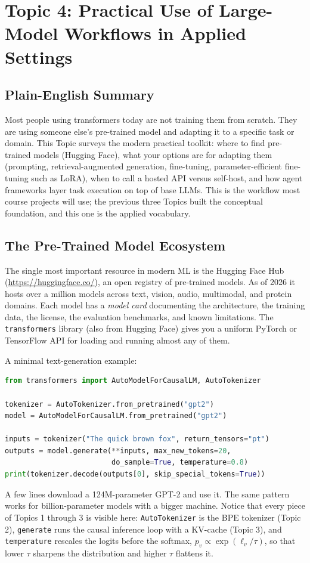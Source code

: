 \documentclass[11pt]{article}
\theoremstyle{remark}
\begin{document}
\clearpage
%
\section{Topic 4: Practical Use of Large-Model Workflows in Applied Settings}
%

\subsection{Plain-English Summary}

Most people using transformers today are not training them from scratch. They are using someone else's pre-trained model and adapting it to a specific task or domain. This Topic surveys the modern practical toolkit: where to find pre-trained models (Hugging Face), what your options are for adapting them (prompting, retrieval-augmented generation, fine-tuning, parameter-efficient fine-tuning such as LoRA), when to call a hosted API versus self-host, and how agent frameworks layer task execution on top of base LLMs. This is the workflow most course projects will use; the previous three Topics built the conceptual foundation, and this one is the applied vocabulary.

\subsection{The Pre-Trained Model Ecosystem}

The single most important resource in modern ML is the Hugging Face Hub (\url{https://huggingface.co/}), an open registry of pre-trained models. As of 2026 it hosts over a million models across text, vision, audio, multimodal, and protein domains. Each model has a \emph{model card} documenting the architecture, the training data, the license, the evaluation benchmarks, and known limitations. The \texttt{transformers} library (also from Hugging Face) gives you a uniform PyTorch or TensorFlow API for loading and running almost any of them.

A minimal text-generation example:
\begin{lstlisting}[language=Python]
from transformers import AutoModelForCausalLM, AutoTokenizer

tokenizer = AutoTokenizer.from_pretrained("gpt2")
model = AutoModelForCausalLM.from_pretrained("gpt2")

inputs = tokenizer("The quick brown fox", return_tensors="pt")
outputs = model.generate(**inputs, max_new_tokens=20,
                         do_sample=True, temperature=0.8)
print(tokenizer.decode(outputs[0], skip_special_tokens=True))
\end{lstlisting}
A few lines download a 124M-parameter GPT-2 and use it. The same pattern works for billion-parameter models with a bigger machine. Notice that every piece of Topics 1 through 3 is visible here: \texttt{AutoTokenizer} is the BPE tokenizer (Topic 2), \texttt{generate} runs the causal inference loop with a KV-cache (Topic 3), and \texttt{temperature} rescales the logits before the softmax, \(p_v \propto \exp(\ell_v / \tau)\), so that lower \(\tau\) sharpens the distribution and higher \(\tau\) flattens it.
\end{document}
